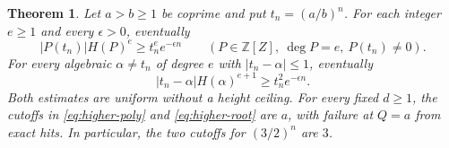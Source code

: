 \documentclass[11pt,a4paper,reqno]{amsart}
\newtheorem{theorem}{Theorem}[section]
\theoremstyle{definition}
\theoremstyle{remark}
\numberwithin{equation}{section}
\begin{document}
\begin{theorem}\label{thm:ratpower}
Let \(a>b\ge1\) be coprime and put \(t_n=(a/b)^n\). For
each integer \(e\ge1\) and every \(\epsilon>0\), eventually
\begin{equation}\label{eq:higher-ratpoly}
 |P(t_n)|H(P)^e\ge t_n^e e^{-\epsilon n}
 \qquad(P\in\mathbb Z[Z],\ \deg P=e,\ P(t_n)\ne0).
\end{equation}
For every algebraic \(\alpha\ne t_n\) of degree \(e\)
with \(|t_n-\alpha|\le1\), eventually
\begin{equation}\label{eq:higher-ratroot}
 |t_n-\alpha|H(\alpha)^{e+1}\ge t_n^2 e^{-\epsilon n}.
\end{equation}
Both estimates are uniform without a height ceiling.
For every fixed \(d\ge1\), the cutoffs in
\eqref{eq:higher-poly} and \eqref{eq:higher-root} are \(a\),
with failure at \(Q=a\) from exact hits. In particular,
the two cutoffs for \((3/2)^n\) are \(3\).
\end{theorem}
\end{document}
